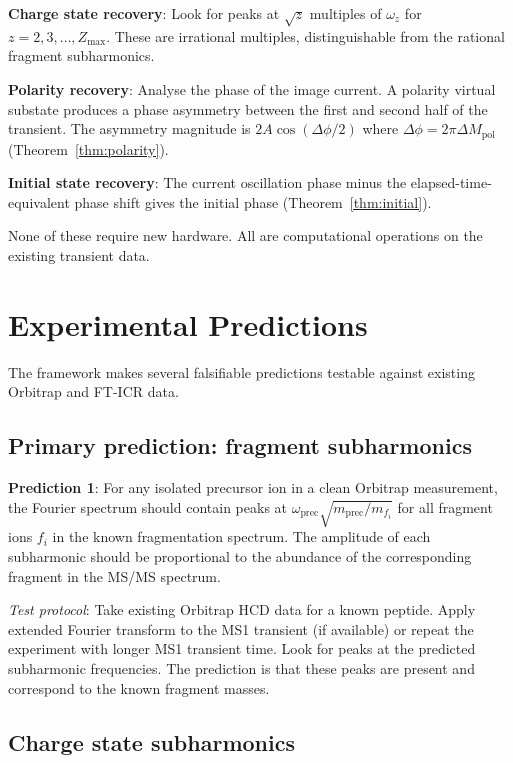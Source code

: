 \documentclass[twocolumn,10pt,a4paper]{article}
\theoremstyle{thmstyle}
\theoremstyle{definition}
\theoremstyle{remark}
\begin{document}
\textbf{Charge state recovery}: Look for peaks at $\sqrt{z}$ multiples
of $\omega_z$ for $z = 2, 3, \ldots, Z_{\max}$. These are irrational
multiples, distinguishable from the rational fragment subharmonics.

\textbf{Polarity recovery}: Analyse the phase of the image current.
A polarity virtual substate produces a phase asymmetry between the
first and second half of the transient. The asymmetry magnitude is
$2A\cos(\Delta\phi/2)$ where $\Delta\phi = 2\pi\Delta M_{\text{pol}}$
(Theorem~\ref{thm:polarity}).

\textbf{Initial state recovery}: The current oscillation phase minus
the elapsed-time-equivalent phase shift gives the initial phase
(Theorem~\ref{thm:initial}).

None of these require new hardware. All are computational operations on
the existing transient data.

\section{Experimental Predictions}
\label{sec:predictions}

The framework makes several falsifiable predictions testable against
existing Orbitrap and FT-ICR data.

\subsection{Primary prediction: fragment subharmonics}

\textbf{Prediction 1}: For any isolated precursor ion in a clean
Orbitrap measurement, the Fourier spectrum should contain peaks at
$\omega_{\text{prec}}\sqrt{m_{\text{prec}}/m_{f_i}}$ for all fragment
ions $f_i$ in the known fragmentation spectrum. The amplitude of each
subharmonic should be proportional to the abundance of the corresponding
fragment in the MS/MS spectrum.

\textit{Test protocol}: Take existing Orbitrap HCD data for a known
peptide. Apply extended Fourier transform to the MS1 transient (if
available) or repeat the experiment with longer MS1 transient time.
Look for peaks at the predicted subharmonic frequencies. The prediction
is that these peaks are present and correspond to the known fragment
masses.

\subsection{Charge state subharmonics}
\end{document}
